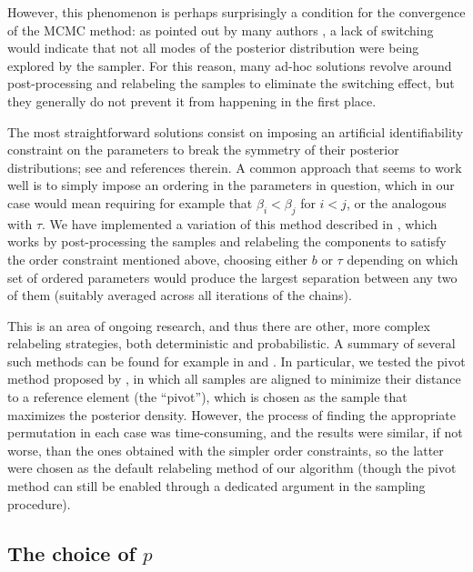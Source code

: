 However, this phenomenon is perhaps surprisingly a condition for the convergence of the MCMC method: as pointed out by many authors \citep[e.g.][]{celeux2000computational}, a lack of switching would indicate that not all modes of the posterior distribution were being explored by the sampler. For this reason, many ad-hoc solutions revolve around post-processing and relabeling the samples to eliminate the switching effect, but they generally do not prevent it from happening in the first place.

The most straightforward solutions consist on imposing an artificial identifiability constraint on the parameters to break the symmetry of their posterior distributions; see \citet{jasra2005markov} and references therein. A common approach that seems to work well is to simply impose an ordering in the parameters in question, which in our case would mean requiring for example that \(\beta_i < \beta_j\) for \(i < j\), or the analogous with \(\tau\). We have implemented a variation of this method described in \citet{simola2021approximate}, which works by post-processing the samples and relabeling the components to satisfy the order constraint mentioned above, choosing either \(b\) or \(\tau\) depending on which set of ordered parameters would produce the largest separation between any two of them (suitably averaged across all iterations of the chains).

This is an area of ongoing research, and thus there are other, more complex relabeling strategies, both deterministic and probabilistic. A summary of several such methods can be found for example in \citet{rodriguez2014label} and \citet{papastamoulis2015label}. In particular, we tested the pivot method proposed by \citet{marin2005bayesian}, in which all samples are aligned to minimize their distance to a reference element (the ``pivot''), which is chosen as the sample that maximizes the posterior density. However, the process of finding the appropriate permutation in each case was time-consuming, and the results were similar, if not worse, than the ones obtained with the simpler order constraints, so the latter were chosen as the default relabeling method of our algorithm (though the pivot method can still be enabled through a dedicated argument in the sampling procedure).

\subsection*{The choice of \(p\)}

